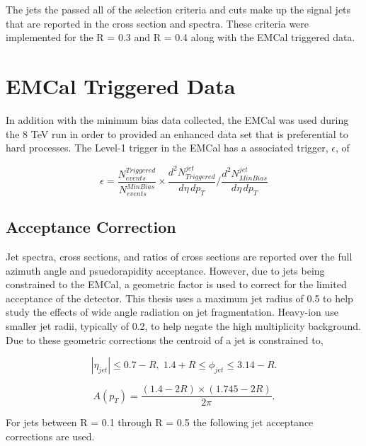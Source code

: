 The jets the passed all of the selection criteria and cuts make up the signal jets that are reported in the cross section and spectra.  These criteria were implemented for the R = 0.3 and R = 0.4 along with the EMCal triggered data.




\section{EMCal Triggered Data}

In addition with the minimum bias data collected, the EMCal was used during the 8 TeV run in order to provided an enhanced data set that is preferential to hard processes.   The Level-1 trigger\cite{Bourrion:2010js} in the EMCal has a associated trigger, $\epsilon$, of 

\begin{equation}
	\epsilon = \frac{N^{Triggered}_{events}}{N^{MinBias}_{events}} \times \frac{d^{2} N_{Triggered}^{jet}}{d\eta \, dp_{T}} \Bigg/  \frac{d^{2} N_{MinBias}^{jet}}{d\eta \, dp_{T}} 
\label{eq:xsecdef}
\end{equation}

\subsection{Acceptance Correction}
Jet spectra, cross sections, and ratios of cross sections are reported over the full azimuth angle and psuedorapidity acceptance.  However, due to jets being constrained to the EMCal, a geometric factor is used to correct for the limited acceptance of the detector.  This thesis uses a maximum jet radius of 0.5 to help study the effects of wide angle radiation on jet fragmentation.  Heavy-ion use smaller jet radii, typically of 0.2, to help negate the high multiplicity background.  Due to these geometric corrections the centroid of a jet is constrained to,

\begin{equation}
|\eta_{jet}| \leq 0.7 - R, \; 1.4 + R \leq \phi_{jet} \leq 3.14 -R.
\label{eq:jetconstration}
\end{equation}

\begin{equation}
A(p_{T}) = \frac{(1.4 - 2R) \times (1.745 - 2R)}{2 \pi}.
\label{eq:acceptance}
\end{equation}

For jets between R = 0.1 through R = 0.5 the following jet acceptance corrections are used.


